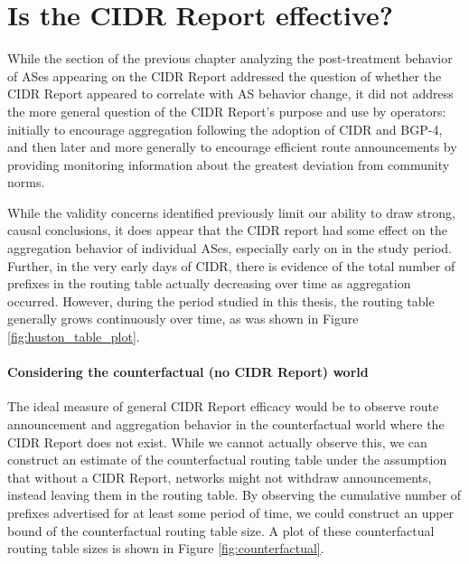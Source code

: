 \section{Is the CIDR Report effective?}
While the section of the previous chapter analyzing the post-treatment behavior
of ASes appearing on the CIDR Report addressed the question of whether the CIDR
Report appeared to correlate with AS behavior change, it did not address the
more general question of the CIDR Report's purpose and use by operators:
initially to encourage aggregation following the adoption of CIDR and BGP-4,
and then later and more generally to encourage efficient route announcements by
providing monitoring information about the greatest deviation from community
norms.

While the validity concerns identified previously limit our ability to draw
strong, causal conclusions, it does appear that the CIDR report had some effect
on the aggregation behavior of individual ASes, especially early on in the
study period. Further, in the very early days of CIDR, there is evidence of the
total number of prefixes in the routing table actually decreasing over time as
aggregation occurred. However, during the period studied in this thesis, the
routing table generally grows continuously over time, as was shown in Figure
\ref{fig:huston_table_plot}.

\paragraph{Considering the counterfactual (no CIDR Report) world}
The ideal measure of general CIDR Report efficacy would be to observe route
announcement and aggregation behavior in the counterfactual world where the
CIDR Report does not exist. While we cannot actually observe this, we can
construct an estimate of the counterfactual routing table under the assumption
that without a CIDR Report, networks might not withdraw announcements, instead
leaving them in the routing table. By observing the cumulative number of
prefixes advertised for at least some period of time, we could construct an
upper bound of the counterfactual routing table size. A plot of these
counterfactual routing table sizes is shown in Figure \ref{fig:counterfactual}.


